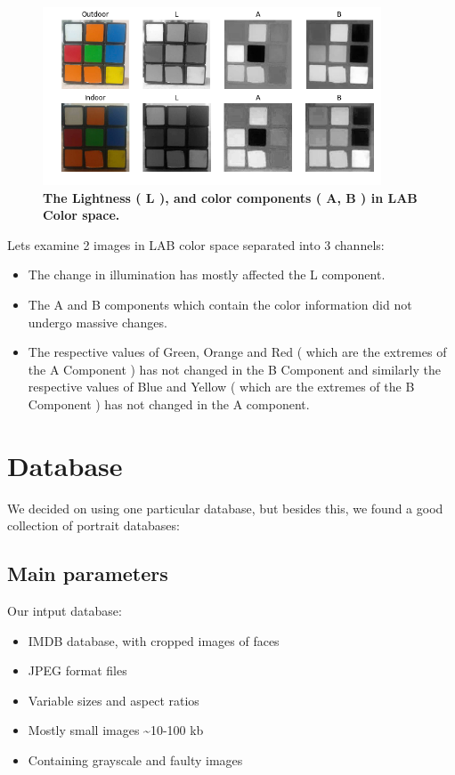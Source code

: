 \documentclass[12pt]{article}
\begin{document}
\begin{figure}[H]
	\centering
	\captionsetup{justification=centering}
	\includegraphics[height=150pt]{components-lab}
	\caption{\textbf{The Lightness ( L ), and color components \newline ( A, B ) in LAB Color space.}}	
	\label{fig:3}
\end{figure}
\newpage
\noindent Lets examine 2 images in LAB color space separated into 3 channels:
\begin{itemize}
	\item The change in illumination has mostly affected the L component.
	\item The A and B components which contain the color information did not undergo massive changes.
	\item The respective values of Green, Orange and Red ( which are the extremes of the A Component ) has not changed in the B Component and similarly the respective values of Blue and Yellow ( which are the extremes of the B Component ) has not changed in the A component.
\end{itemize}

\section{Database}
We decided on using one particular database, but besides this, we found a good collection of portrait databases:\cite{portraitdata}
\subsection{Main parameters}
Our intput database:
\begin{itemize}
	\setlength\itemsep{0.3em}
	\renewcommand\labelitemi{--}
	\item IMDB database\cite{database}, with cropped images of faces\cite{dataset}
	\item JPEG format files
	\item Variable sizes and aspect ratios
	\item Mostly small images \textasciitilde10-100 kb
	\item Containing grayscale and faulty images
\end{itemize}
\vspace{6pt}
\end{document}
